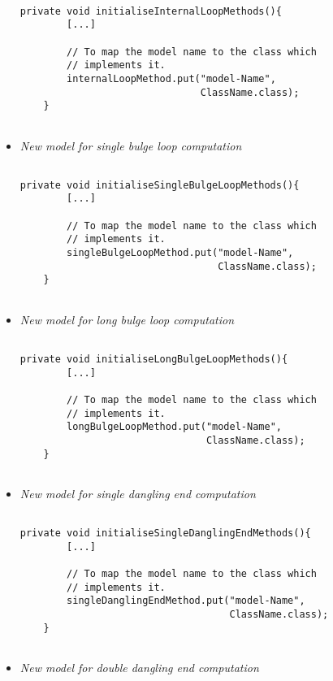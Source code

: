\documentclass{article}
\begin{document}
\begin{itemize}
\begin{verbatim}

private void initialiseInternalLoopMethods(){
		[...]
		
		// To map the model name to the class which 
		// implements it.
        internalLoopMethod.put("model-Name", 
                               ClassName.class);
	}
	
\end{verbatim}

\item \textit{New model for single bulge loop computation}

\begin{verbatim}

private void initialiseSingleBulgeLoopMethods(){
		[...]
		
		// To map the model name to the class which 
		// implements it.
        singleBulgeLoopMethod.put("model-Name", 
                                  ClassName.class);
	}
	
\end{verbatim}

\item \textit{New model for long bulge loop computation}

\begin{verbatim}

private void initialiseLongBulgeLoopMethods(){
		[...]
		
		// To map the model name to the class which 
		// implements it.
        longBulgeLoopMethod.put("model-Name", 
                                ClassName.class);
	}
	
\end{verbatim}

\item \textit{New model for single dangling end computation}

\begin{verbatim}

private void initialiseSingleDanglingEndMethods(){
		[...]
		
		// To map the model name to the class which 
		// implements it.
        singleDanglingEndMethod.put("model-Name", 
                                    ClassName.class);
	}
	
\end{verbatim}

\item \textit{New model for double dangling end computation}

\begin{verbatim}


\end{verbatim}
\end{itemize}
\end{document}
